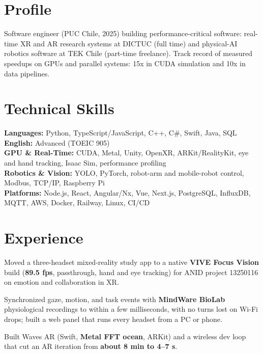 \documentclass[letterpaper,10pt]{article}
\begin{document}

\section{Profile}
{\small Software engineer (PUC Chile, 2025) building performance-critical software: real-time XR and AR research systems at DICTUC (full time) and physical-AI robotics software at TEK Chile (part-time freelance). Track record of measured speedups on GPUs and parallel systems: 15x in CUDA simulation and 10x in data pipelines.\par}

\section{Technical Skills}
{\small
\textbf{Languages:} Python, TypeScript/JavaScript, C++, C\#, Swift, Java, SQL \quad \textbf{English:} Advanced (TOEIC 905)\\
\textbf{GPU \& Real-Time:} CUDA, Metal, Unity, OpenXR, ARKit/RealityKit, eye and hand tracking, Isaac Sim, performance profiling\\
\textbf{Robotics \& Vision:} YOLO, PyTorch, robot-arm and mobile-robot control, Modbus, TCP/IP, Raspberry Pi\\
\textbf{Platforms:} Node.js, React, Angular/Nx, Vue, Next.js, PostgreSQL, InfluxDB, MQTT, AWS, Docker, Railway, Linux, CI/CD\par}

\section{Experience}
\begin{points}
  \item Moved a three-headset mixed-reality study app to a native \textbf{VIVE Focus Vision} build (\textbf{89.5 fps}, passthrough, hand and eye tracking) for ANID project 13250116 on emotion and collaboration in XR.
  \item Synchronized gaze, motion, and task events with \textbf{MindWare BioLab} physiological recordings to within a few milliseconds, with no turns lost on Wi-Fi drops; built a web panel that runs every headset from a PC or phone.
  \item Built Waves AR (Swift, \textbf{Metal FFT ocean}, ARKit) and a wireless dev loop that cut an AR iteration from \textbf{about 8 min to 4--7 s}.
\end{points}
\end{document}

